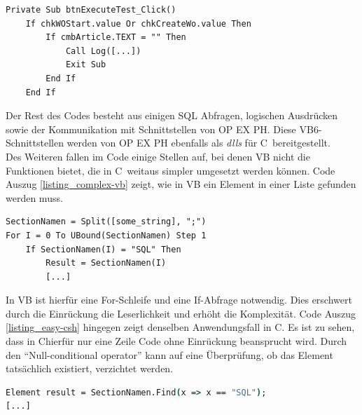 \begin{lstlisting}[language={[Visual]Basic},
frame=single,
framexleftmargin=15pt,
style=algoBericht,
label={listing_logikfehler},
captionpos=b,
firstnumber=233,
caption={Logische Redundanz im \gls{VB}6-Code}]
Private Sub btnExecuteTest_Click()
    If chkWOStart.value Or chkCreateWo.value Then
        If cmbArticle.TEXT = "" Then
            Call Log([...])
            Exit Sub
        End If
    End If
\end{lstlisting}

\noindent Der Rest des Codes besteht aus einigen \gls{SQL} Abfragen, logischen Ausdrücken sowie der Kommunikation mit Schnittstellen von \gls{OP EX PH}. Diese \gls{VB}6-Schnittstellen werden von \gls{OP EX PH} ebenfalls als \textit{\glspl{dll}} für C\myHashtag\ bereitgestellt.\\
Des Weiteren fallen im Code einige Stellen auf, bei denen \gls{VB} nicht die Funktionen bietet, die in C\myHashtag\ weitaus simpler umgesetzt werden können. Code Auszug \ref{listing_complex-vb} zeigt, wie in \gls{VB} ein Element in einer Liste gefunden werden muss.\\

\begin{lstlisting}[language={[Visual]Basic},
frame=single,
framexleftmargin=15pt,
style=algoBericht,
label={listing_complex-vb},
captionpos=b,
firstnumber=580,
caption={Finden eines Listenelements in \gls{VB}6}]
SectionNamen = Split([some_string], ";")
For I = 0 To UBound(SectionNamen) Step 1
    If SectionNamen(I) = "SQL" Then
        Result = SectionNamen(I)
        [...]
\end{lstlisting}

\noindent In \gls{VB} ist hierfür eine For-Schleife und eine If-Abfrage notwendig. Dies erschwert durch die Einrückung die Leserlichkeit und erhöht die Komplexität. Code Auszug \ref{listing_easy-csh} hingegen zeigt denselben Anwendungsfall in C\myHashtag. Es ist zu sehen, dass in C\myHashtag hierfür nur eine Zeile Code ohne Einrückung beansprucht wird. Durch den \enquote{Null-conditional operator} kann auf eine Überprüfung, ob das Element tatsächlich existiert, verzichtet werden.\\

\begin{lstlisting}[language={csh},
frame=single,
framexleftmargin=15pt,
style=algoBericht,
label={listing_easy-csh},
captionpos=b,
caption={Finden eines Listenelements in C\#}]
Element result = SectionNamen.Find(x => x == "SQL");
[...]
\end{lstlisting}

